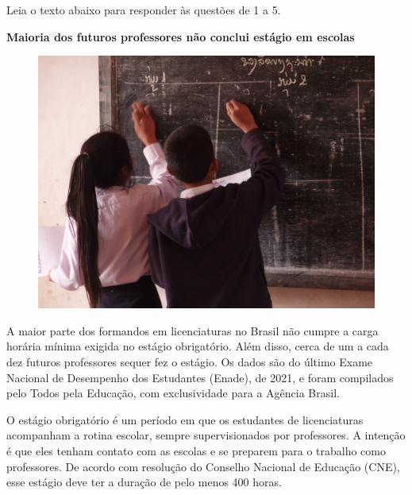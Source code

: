 

Leia o texto abaixo para responder às questões de 1 a 5.

\begin{myquote}

\textbf{Maioria dos futuros professores não conclui estágio em escolas}

\begin{figure}[H]
\centering
\includegraphics[scale=0.25]{./imgSAEB_7_POR/media/image45.png}
\end{figure}

A maior parte dos formandos em licenciaturas no Brasil não cumpre a carga
horária mínima exigida no estágio obrigatório. Além disso, cerca de um a cada
dez futuros professores sequer fez o estágio. Os dados são do último Exame
Nacional de Desempenho dos Estudantes (Enade), de 2021, e foram compilados
pelo Todos pela Educação, com exclusividade para a Agência Brasil.

O estágio obrigatório é um período em que os estudantes de licenciaturas
acompanham a rotina escolar, sempre supervisionados por professores. A
intenção é que eles tenham contato com as escolas e se preparem para o
trabalho como professores. De acordo com resolução do Conselho Nacional de
Educação (CNE), esse estágio deve ter a duração de pelo menos 400 horas.


\end{myquote}

